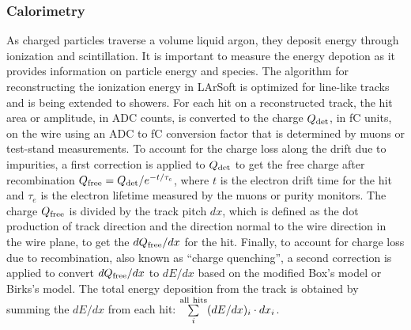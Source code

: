 
\subsubsection{Calorimetry}


As charged particles traverse a volume liquid argon, they deposit
energy through ionization and scintillation. It is important to
measure the energy depotion as it provides information on particle
energy and species. The algorithm for reconstructing the ionization
energy in LArSoft is optimized for line-like tracks and is being
extended to showers. 
For each hit on a reconstructed track, the hit area or amplitude, in ADC counts, is
converted to the charge $Q_{\rm{det}}$, in fC units, on the wire using an
ADC to fC conversion factor that is determined by muons or test-stand
measurements. To account for the charge loss along the drift due to
impurities, a first correction is applied to $Q_{\rm{det}}$ to get the free
charge after recombination $Q_{\rm{free}} = Q_{\rm{det}}/e^{-t/\tau_{e}}$, where
$t$ is the electron drift time for the hit and $\tau_{e}$ is the
electron lifetime measured by the muons or purity monitors. The charge
$Q_{\rm{free}}$ is divided by the track pitch $dx$, which is defined as the
dot production of track direction and the direction normal to the wire
direction in the wire plane, to get the $dQ_{\rm{free}}/dx$ for the
hit. Finally, to account for charge loss due to recombination, also
known as ``charge quenching'', a second correction is applied to
convert $dQ_{\rm{free}}/dx$ to $dE/dx$ based on the modified Box's model
\cite{box} or Birks's model\cite{birks}. The total energy
deposition from the track is obtained by summing the $dE/dx$ from each
hit: $\sum\limits_{i}^{\rm{all\ hits}}(dE/dx)_{i}\cdot dx_{i}$.

%


